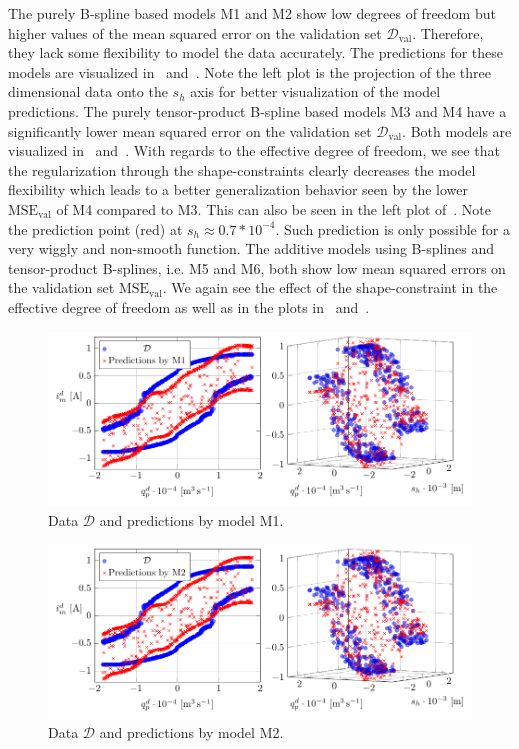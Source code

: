 The purely B-spline based models M1 and M2 show low degrees of freedom but higher values of the mean squared error on the validation set $\mathcal{D}_{\text{val}}$. Therefore, they lack some flexibility to model the data accurately. The predictions for these models are visualized in~ and~. Note the left plot is the projection of the three dimensional data onto the $s_h$ axis for better visualization of the model predictions. The purely tensor-product B-spline based models M3 and M4 have a significantly lower mean squared error on the validation set $\mathcal{D}_{\text{val}}$. Both models are visualized in~ and~. With regards to the effective degree of freedom, we see that the regularization through the shape-constraints clearly decreases the model flexibility which leads to a better generalization behavior seen by the lower $\text{MSE}_{\text{val}}$ of M4 compared to M3. This can also be seen in the left plot of~. Note the prediction point (red) at $s_h \approx 0.7*10^{-4}$. Such prediction is only possible for a very wiggly and non-smooth function. The additive models using B-splines and tensor-product B-splines, i.e. M5 and M6, both show low mean squared errors on the validation set $\text{MSE}_{\text{val}}$. We again see the effect of the shape-constraint in the effective degree of freedom as well as in the plots in~ and~. 

\begin{figure}[H]
	\centering 
	\includegraphics{graphics/pgfplots/cha5/Bosch/M1.pdf}
	\caption{Data $\mathcal{D}$ and predictions by model M1.}
	\label{fig:bosch-M1}
\end{figure}

\begin{figure}[H]
	\centering 
	\includegraphics{graphics/pgfplots/cha5/Bosch/M2.pdf}
	\caption{Data $\mathcal{D}$ and predictions by model M2.}
	\label{fig:bosch-M2}
\end{figure}

